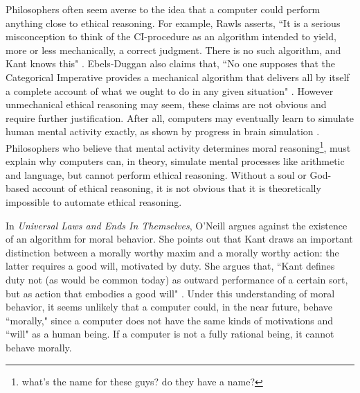 %
\begin{isabellebody}%
%
%
\isadelimtheory
%
\endisadelimtheory
%
\isatagtheory
%
\endisatagtheory
{\isafoldtheory}%
%
\isadelimtheory
%
\endisadelimtheory
%
\isadelimdocument
%
\endisadelimdocument
%
\isatagdocument
%
\isamarkuptrue%
%
\endisatagdocument
{\isafolddocument}%
%
\isadelimdocument
%
\endisadelimdocument
%
\begin{isamarkuptext}%
Philosophers often seem averse to the idea that a computer could perform anything close to ethical 
reasoning. For example, Rawls asserts, ``It is a serious misconception to think of the CI-procedure 
as an algorithm intended to yield, more or less mechanically, a correct judgment. There is no such 
algorithm, and Kant knows this" \citep[166]{rawlslectures}. Ebels-Duggan also claims that, ``No one supposes that the Categorical
Imperative provides a mechanical algorithm that delivers all by itself a complete account of what we 
ought to do in any given situation" \citep[174]{ebelsduggan}. However unmechanical ethical reasoning
may seem, these claims are not obvious and require further justification. After all, computers may eventually 
learn to simulate human mental activity exactly, as shown by progress in brain simulation \citep{brainsimulation}. 
Philosophers who believe that mental activity determines moral reasoning\footnote{what's the name for these
guys? do they have a name?}, must explain why computers can, in theory, simulate mental processes like arithmetic 
and language, but cannot perform ethical reasoning. Without a soul or God-based account of ethical reasoning, 
it is not obvious that it is theoretically impossible to automate ethical reasoning.

In \emph{Universal Laws and Ends In Themselves}, O'Neill argues against the existence of an algorithm for
moral behavior. She points out that Kant draws an important distinction between a morally worthy maxim 
and a morally worthy action: the latter requires a good will, motivated by duty. She argues that, 
``Kant defines duty not (as would be common today) as outward performance of a certain sort, but as action
that embodies a good will" \citep[345]{oneilluniversallaws}. Under this understanding of moral behavior, 
it seems unlikely that a computer could, in the near future, behave ``morally," since a computer does 
not have the same kinds of motivations and ``will" as a human being. If a computer is not a fully rational
being, it cannot behave morally.


\end{isamarkuptext}
\end{isabellebody}
